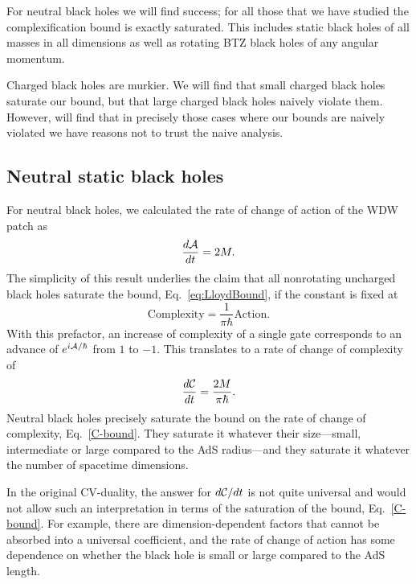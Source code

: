 \documentclass[12pt]{article}
\numberwithin{equation}{section}
\def\CA{{\cal A}}
\def\CC{{\cal C}}
\begin{document}
For neutral black holes we will find success; for all those that we have studied the complexification bound is exactly saturated. This includes static black holes of all masses in all dimensions as well as rotating BTZ black holes of any angular momentum.

Charged black holes are  murkier. We will find that small charged black holes saturate our bound, but that large charged black holes naively violate them. However, will find that in precisely those cases where our bounds are naively violated we have reasons not to trust the naive analysis.








\subsection{Neutral static black holes}

For neutral black holes, we calculated the rate of change of action of the WDW patch as
\begin{equation}
\frac{d \CA }{dt} = 2 M.
\end{equation}
The simplicity of this result underlies the claim that all nonrotating uncharged black holes
 saturate the bound, Eq.~\ref{eq:LloydBound}, if the constant  is fixed at
\begin{equation}
\textrm{Complexity} = \frac{1}{\pi \hbar}  \textrm{Action}.
\end{equation}
With this prefactor, an increase of complexity of a single gate corresponds to an advance of $e^{i\CA/\hbar}$ from $1$ to $-1$.
This translates to a rate of change of complexity of
\begin{equation}
\frac{d\CC}{dt} = \frac{2M}{\pi \hbar}.
\end{equation}
Neutral black holes precisely saturate the bound on the rate of change of complexity, Eq.~\ref{C-bound}. They saturate it whatever their size---small, intermediate or large compared to the AdS radius---and they saturate it whatever the number of spacetime dimensions.

In the original CV-duality, the answer for $d\CC/dt$ is not quite universal and would not allow such an interpretation in terms of the saturation of the  bound,  Eq.~\ref{C-bound}. For example, there are dimension-dependent factors that cannot be absorbed into a universal coefficient, and the  rate of change of action has some dependence on whether the black hole is small or large compared to the AdS length.
\end{document}
